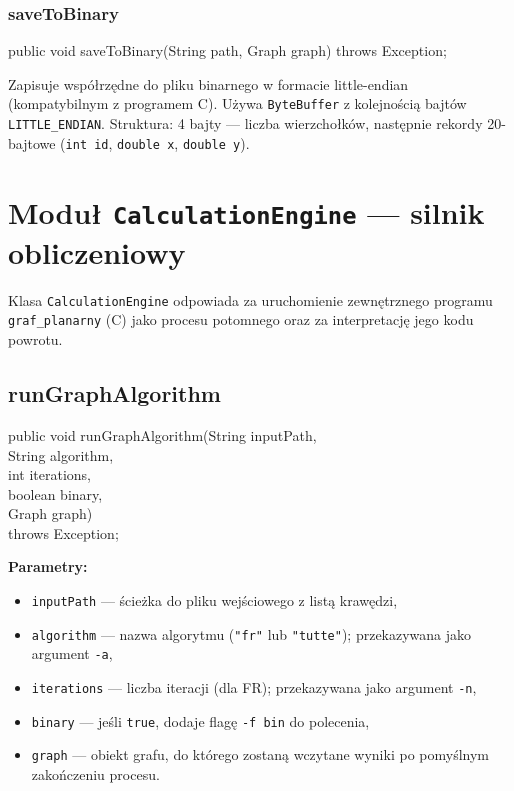 \documentclass[a4paper, 11pt]{article}
\begin{document}
\subsubsection{saveToBinary}

\begin{cmdbox}
public void saveToBinary(String path, Graph graph) throws Exception;
\end{cmdbox}

Zapisuje współrzędne do pliku binarnego w formacie little-endian
(kompatybilnym z programem C). Używa \texttt{ByteBuffer} z kolejnością
bajtów \texttt{LITTLE\_ENDIAN}. Struktura: 4 bajty --- liczba
wierzchołków, następnie rekordy 20-bajtowe (\texttt{int id},
\texttt{double x}, \texttt{double y}).

\section{Moduł \texttt{CalculationEngine} --- silnik obliczeniowy}

Klasa \texttt{CalculationEngine} odpowiada za uruchomienie zewnętrznego
programu \texttt{graf\_planarny} (C) jako procesu potomnego oraz za
interpretację jego kodu powrotu.

\subsection{runGraphAlgorithm}

\begin{cmdbox}
public void runGraphAlgorithm(String inputPath,\\
\quad\qquad\qquad\qquad\qquad\; String algorithm,\\
\quad\qquad\qquad\qquad\qquad\; int iterations,\\
\quad\qquad\qquad\qquad\qquad\; boolean binary,\\
\quad\qquad\qquad\qquad\qquad\; Graph graph)\\
\quad\qquad\qquad\qquad\qquad\; throws Exception;
\end{cmdbox}

\textbf{Parametry:}
\begin{itemize}
  \item \texttt{inputPath} --- ścieżka do pliku wejściowego z listą krawędzi,
  \item \texttt{algorithm} --- nazwa algorytmu (\texttt{"fr"} lub
    \texttt{"tutte"}); przekazywana jako argument \texttt{-a},
  \item \texttt{iterations} --- liczba iteracji (dla FR); przekazywana
    jako argument \texttt{-n},
  \item \texttt{binary} --- jeśli \texttt{true}, dodaje flagę
    \texttt{-f bin} do polecenia,
  \item \texttt{graph} --- obiekt grafu, do którego zostaną wczytane
    wyniki po pomyślnym zakończeniu procesu.
\end{itemize}
\end{document}
